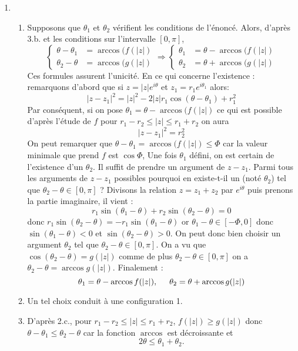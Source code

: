 \begin{enumerate}
\item \begin{enumerate}
\item 
Supposons que $\theta_1$ et $\theta_2$ vérifient les conditions de l'énoncé. Alors, d'après 3.b. et les conditions sur l'intervalle $[0,\pi]$,
\[
\left\lbrace 
\begin{aligned}
\theta - \theta_1 &= \arccos(f(|z|)\\
\theta_2-\theta &= \arccos(g(|z|) 
\end{aligned}
\right. \Rightarrow
\left\lbrace 
\begin{aligned}
\theta_1 &= \theta -\arccos(f(|z|)\\
\theta_2 &= \theta + \arccos(g(|z|) 
\end{aligned}
\right. 
\]
Ces formules assurent l'unicité.\newline
En ce qui concerne l'existence : remarquons d'abord que si $z=|z|e^{i\theta}$ et $z_1=r_1e^{i\theta_1}$ alors: 
\[
|z-z_1|^2=|z|^2-2|z|r_1\cos(\theta - \theta_1)+r_1^2
\] 
Par conséquent, si on pose $\theta_1 = \theta -\arccos(f(|z|)$ ce qui est possible d'après l'étude de $f$ pour $r_1-r_2\leq|z|\leq r_1+r_2$ on aura
\[
|z-z_1|^2=r_2^2
\]
On peut remarquer que  $\theta - \theta_1 = \arccos(f(|z|)\leq \Phi$ car la valeur minimale que prend $f$ est $\cos \Phi$,\newline
Une fois $\theta_1$ défini, on est certain de l'existence d'un $\theta_2$. Il suffit de prendre un argument de $z-z_1$.\newline
Parmi tous les arguments de $z-z_1$ possibles pourquoi en existe-t-il un (noté $\theta_2$) tel que  $\theta_2-\theta \in [0,\pi]$ ?\newline
Divisons la relation $z=z_1+z_2$ par $e^{i\theta}$ puis prenons la partie imaginaire, il vient :
\[
r_1\sin(\theta_1-\theta) + r_2\sin(\theta_2-\theta)=0
\]
donc $r_1\sin(\theta_2-\theta)= - r_1\sin(\theta_1-\theta)$ or $\theta_1-\theta \in [-\Phi,0]$ donc $\sin(\theta_1-\theta)<0$ et $\sin(\theta_2-\theta)>0$. On peut donc bien choisir un argument $\theta_2$ tel que $\theta_2-\theta \in [0,\pi]$.\newline
On a vu que $\cos(\theta_2 - \theta)=g(|z|)$ comme de plus $\theta_2-\theta \in [0,\pi]$ on a $\theta_2-\theta=\arccos g(|z|)$. Finalement :
\[
\theta_1 = \theta - \arccos f(|z|), \hspace{0.5cm}
\theta_2 = \theta + \arccos g(|z|)
\]
\item Un tel choix conduit à une configuration 1.
\item D'après 2.c., pour $r_1-r_2\leq|z|\leq r_1+r_2$, $f(|z|)\geq g(|z|)$ donc $\theta - \theta_1 \leq \theta_2-\theta$ car la fonction $\arccos$ est décroissante et 
\[
2\theta \leq \theta_1 + \theta_2.
\]
\end{enumerate}
\end{enumerate}